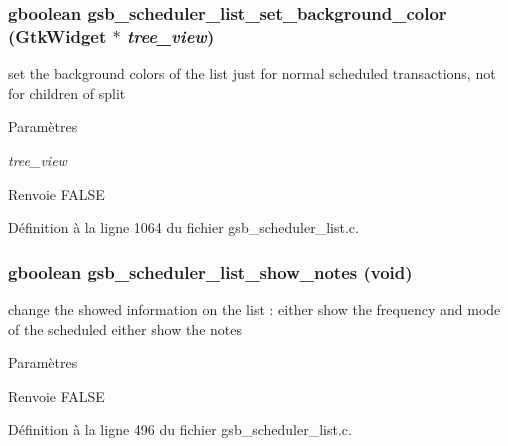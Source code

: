 \subsubsection[{gsb\_\-scheduler\_\-list\_\-set\_\-background\_\-color}]{\setlength{\rightskip}{0pt plus 5cm}gboolean gsb\_\-scheduler\_\-list\_\-set\_\-background\_\-color (GtkWidget $\ast$ {\em tree\_\-view})}\label{gsb__scheduler__list_8c_a4348c22b2bc74713a8615c749c61f4d8}
set the background colors of the list just for normal scheduled transactions, not for children of split


\begin{DoxyParams}{Paramètres}
\item[{\em tree\_\-view}]\end{DoxyParams}
\begin{DoxyReturn}{Renvoie}
FALSE 
\end{DoxyReturn}


Définition à la ligne 1064 du fichier gsb\_\-scheduler\_\-list.c.

\subsubsection[{gsb\_\-scheduler\_\-list\_\-show\_\-notes}]{\setlength{\rightskip}{0pt plus 5cm}gboolean gsb\_\-scheduler\_\-list\_\-show\_\-notes (void)}\label{gsb__scheduler__list_8c_a9eaf111074be94831038960ae9e56732}
change the showed information on the list : either show the frequency and mode of the scheduled either show the notes


\begin{DoxyParams}{Paramètres}
\item[{\em }]\end{DoxyParams}
\begin{DoxyReturn}{Renvoie}
FALSE 
\end{DoxyReturn}


Définition à la ligne 496 du fichier gsb\_\-scheduler\_\-list.c.

